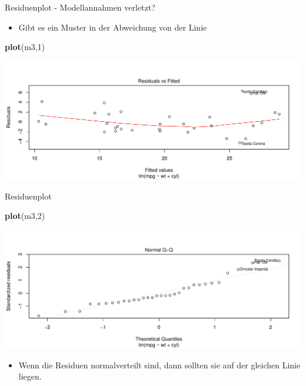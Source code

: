 \documentclass[ignorenonframetext,]{beamer}
\newenvironment{Shaded}{\begin{snugshade}}{\end{snugshade}}
\newcommand{\DecValTok}[1]{\textcolor[rgb]{0.00,0.00,0.81}{#1}}
\newcommand{\KeywordTok}[1]{\textcolor[rgb]{0.13,0.29,0.53}{\textbf{#1}}}
\newcommand{\NormalTok}[1]{#1}
\providecommand{\tightlist}{%
  \setlength{\itemsep}{0pt}\setlength{\parskip}{0pt}}
\begin{document}
\begin{frame}[fragile]{Residuenplot - Modellannahmen verletzt?}
\protect\hypertarget{residuenplot---modellannahmen-verletzt}{}

\begin{itemize}
\tightlist
\item
  Gibt es ein Muster in der Abweichung von der Linie
\end{itemize}

\begin{Shaded}
\begin{Highlighting}[]
\KeywordTok{plot}\NormalTok{(m3,}\DecValTok{1}\NormalTok{)}
\end{Highlighting}
\end{Shaded}

\includegraphics{B3_linreg_files/figure-beamer/unnamed-chunk-23-1.pdf}

\end{frame}

\begin{frame}[fragile]{Residuenplot}
\protect\hypertarget{residuenplot}{}

\begin{Shaded}
\begin{Highlighting}[]
\KeywordTok{plot}\NormalTok{(m3,}\DecValTok{2}\NormalTok{)}
\end{Highlighting}
\end{Shaded}

\includegraphics{B3_linreg_files/figure-beamer/unnamed-chunk-24-1.pdf}

\begin{itemize}
\tightlist
\item
  Wenn die Residuen normalverteilt sind, dann sollten sie auf der
  gleichen Linie liegen.
\end{itemize}

\end{frame}
\end{document}
